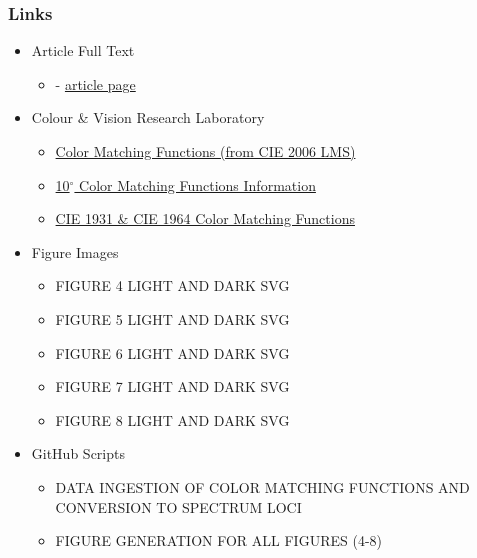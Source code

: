 \documentclass{article}
\begin{document}
\begin{multicols}{2}
\subsubsection{Links} %

\begin{itemize}
    \item Article Full Text
    \begin{itemize}
        \item \cite{sharpe2011luminous} - \href{http://www.cvrl.org/people/Stockman/pubs/2011\%20Vstar\%20correction\%20SSJJ.pdf}{article page}
    \end{itemize}
    \item Colour \& Vision Research Laboratory
    \begin{itemize}
        \item \href{http://www.cvrl.org/ciexyzpr.htm}{Color Matching Functions (from CIE 2006 LMS)}
        \item \href{http://www.cvrl.org/database/text/cienewxyz/cie2012xyz10.htm}{10$^\circ$ Color Matching Functions Information}
        \item \href{http://www.cvrl.org/cie.htm}{CIE 1931 \& CIE 1964 Color Matching Functions}
    \end{itemize}
    \item Figure Images
    \begin{itemize}
        \item FIGURE 4 LIGHT AND DARK SVG
        \item FIGURE 5 LIGHT AND DARK SVG
        \item FIGURE 6 LIGHT AND DARK SVG
        \item FIGURE 7 LIGHT AND DARK SVG
        \item FIGURE 8 LIGHT AND DARK SVG
    \end{itemize}
    \item GitHub Scripts
    \begin{itemize}
        \item DATA INGESTION OF COLOR MATCHING FUNCTIONS AND CONVERSION TO SPECTRUM LOCI
        \item FIGURE GENERATION FOR ALL FIGURES (4-8)
    \end{itemize}
\end{itemize}

\end{multicols}

\end{document}
